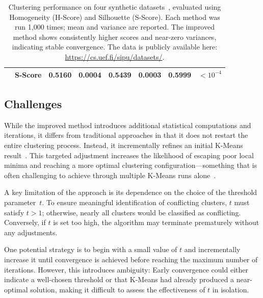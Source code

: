 \documentclass[10pt,twocolumn,letterpaper]{article}
\begin{document}
\begin{table}
\begin{tabular}{ll c c c c c c}
                                             & \textbf{S-Score} & 0.5160                               & 0.0004                                 & 0.5439                                & 0.0003            & \textbf{0.5999} & \textbf{$<10^{-4}$} \\
        \bottomrule
    \end{tabular}
    \vspace{5pt}
    \caption{
        Clustering performance on four synthetic datasets~\cite{ClusteringDatasets}, evaluated using Homogeneity (H-Score) and Silhouette (S-Score). Each method was run 1,000 times; mean and variance are reported. The improved method shows consistently higher scores and near-zero variances, indicating stable convergence. The data is publicly available here: \href{https://cs.uef.fi/sipu/datasets/}{https://cs.uef.fi/sipu/datasets/}.
    }
    \label{tab:clustering_comparison}
\end{table}


\subsection{Challenges}\label{subsec:challenges}

While the improved method introduces additional statistical computations and
iterations, it differs from traditional approaches in that it does not restart
the entire clustering process. Instead, it incrementally refines an initial
K-Means result~\cite{Abdullah10601123}. This targeted adjustment increases the
likelihood of escaping poor local minima and reaching a more optimal clustering
configuration—something that is often challenging to achieve through multiple
K-Means runs alone~\cite{FRANTI201995}.

A key limitation of the approach is its dependence on the choice of the
threshold parameter~$t$. To ensure meaningful identification of conflicting
clusters, $t$ must satisfy $t > 1$; otherwise, nearly all clusters would be
classified as conflicting. Conversely, if $t$ is set too high, the algorithm
may terminate prematurely without any adjustments.

One potential strategy is to begin with a small value of $t$ and incrementally
increase it until convergence is achieved before reaching the maximum number of
iterations. However, this introduces ambiguity: Early convergence could either
indicate a well-chosen threshold or that K-Means had already produced a
near-optimal solution, making it difficult to assess the effectiveness of $t$
in isolation.
\end{document}
